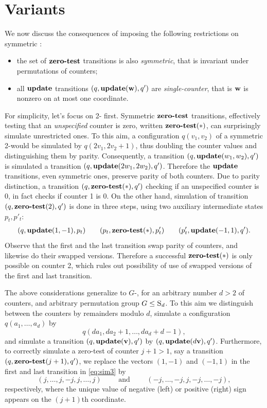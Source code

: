 
\section{Variants} \label{sec:variants}

We now discuss the consequences of imposing the following 
restrictions on symmetric :
% 
\begin{itemize}
\item the set of $\textbf{zero-test}$ transitions is also \emph{symmetric}, 
that is invariant under permutations of counters; 
\item all $\textbf{update}$ transitions $(q,\textbf{update}(\mathbf{w}),q')$ are 
\emph{single-counter}, that is $\mathbf{w}$  is nonzero on at most one coordinate.
\end{itemize}
% 

For simplicity, let's focus on 2- first.
Symmetric $\textbf{zero-test}$ transitions, effectively testing
that an \emph{unspecified} counter is zero,
written $\textbf{zero-test}(\ast)$,
can surprisingly simulate unrestricted ones.
To this aim, a configuration $q(v_1,v_2)$ of a symmetric 2-\cm would 
be simulated by $q(2v_1,2v_2+1)$, thus doubling the counter values and 
distinguishing them by parity.
Consequently, a transition $(q,\textbf{update}(w_1,w_2),q')$ is simulated
a transition $(q,\textbf{update}(2w_1,2w_2),q')$.
Therefore the $\textbf{update}$ transitions, even symmetric ones, preserve
parity of both counters.
Due to parity distinction, a transition
$(q,\textbf{zero-test}(\ast),q')$ checking if an unspecified counter is 0,
in fact checks if counter 1 is 0.
On the other hand,
simulation of transition $(q,\textbf{zero-test}(2), q')$
is done in three steps,
using two auxiliary intermediate states $p_t,p'_t$:
\begin{align} \label{eq:sim3}
(q,\textbf{update}(1,-1),p_t) \qquad
(p_t, \textbf{zero-test}(\ast), p'_t) \qquad
(p'_t, \textbf{update}(-1,1),q').
\end{align}
Observe that the first and the last transition swap parity of
counters, and likewise do their swapped versions.
Therefore a successful $\textbf{zero-test}(\ast)$ is only possible on
counter 2, which rules out possibility of use of swapped versions
of the first and last transition.

\smallskip

The above considerations generalize 
to $G$-, for 
an arbitrary number $d>2$ of counters, and arbitrary permutation group
$G\leq\textsc{S}_{d}$.
To this aim we distinguish between the counters by remainders modulo 
$d$, simulate a configuration $q(a_1, \ldots, a_d)$ by 
\[q(d a_1, d a_2 + 1, \ldots, d a_d + d-1),\]
and simulate a transition $(q,\textbf{update}(\mathbf{v}), q')$ by
$(q,\textbf{update}(d\mathbf{v}), q')$.
Furthermore, to correctly simulate a zero-test of counter $j+1>1$, 
say a transition $(q,\textbf{zero-test}(j+1),q')$,
we replace the vectors $(1,-1)$ and $(-1,1)$ in the first
and last transition in \eqref{eq:sim3} by
\[
(j,\ldots,j,-j, j, \ldots, j)
\qquad\text{ and } \qquad
(-j,\ldots,-j,j, -j, \ldots, -j),
\]
respectively, where the unique value of negative (left) or positive
(right) sign appears on the $(j+1)$th coordinate.


